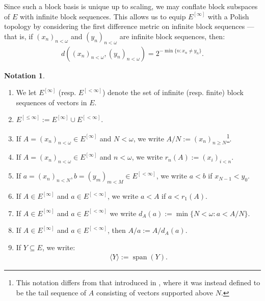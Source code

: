 \documentclass[10pt,a4paper]{amsart}
\theoremstyle{plain}
\numberwithin{equation}{section}
\theoremstyle{definition}
\newtheorem{notation}[theorem]{Notation}
\newcommand{\func}{\operatorname}
\renewcommand{\c}[1]{\langle #1 \rangle}
\begin{document}
Since such a block basis is unique up to scaling, we may conflate block subspaces of $E$ with infinite block sequences. This allows us to equip $E^{[\infty]}$ with a Polish topology by considering the first difference metric on infinite block sequences --- that is, if $(x_n)_{n<\omega}$ and $(y_n)_{n<\omega}$ are infinite block sequences, then:
\begin{align*}
    d((x_n)_{n<\omega},(y_n)_{n<\omega}) = 2^{-\min\{n : x_n \neq y_n\}}.
\end{align*}

\begin{notation}
\label{not:notations}
\hfill
    \begin{enumerate}
        \item We let $E^{[\infty]}$ (resp. $E^{[<\infty]}$) denote the set of infinite (resp. finite) block sequences of vectors in $E$. 

        \item $E^{[\leq\infty]} := E^{[\infty]} \cup E^{[<\infty]}$.

        \item If $A = (x_n)_{n<\omega} \in E^{[\infty]}$ and $N < \omega$, we write $A/N := (x_n)_{n \geq N}$\footnote{This notation differs from that introduced in \cite{S23}, where it was instead defined to be the tail sequence of $A$ consisting of vectors supported above $N$.}.
        
        \item If $A = (x_n)_{n<\omega} \in E^{[\infty]}$ and $n < \omega$, we write $r_n(A) := (x_i)_{i<n}$.
        
        \item If $a = (x_n)_{n<N},b = (y_m)_{m<M} \in E^{[<\infty]}$, we write $a < b$ if $x_{N-1} < y_0$.
        
        \item If $A \in E^{[\infty]}$ and $a \in E^{[<\infty]}$, we write $a < A$ if $a < r_1(A)$.
        
        \item If $A \in E^{[\infty]}$ and $a \in E^{[<\infty]}$ we write $d_A(a) := \min\{N < \omega : a < A/N\}$.

        \item If $A \in E^{[\infty]}$ and $a \in E^{[<\infty]}$, then $A/a := A/d_A(a)$.
        
        \item If $Y \subseteq E$, we write:
        \begin{align*}
            \c{Y} := \func{span}(Y).
        \end{align*}


\end{enumerate}
\end{notation}
\end{document}
